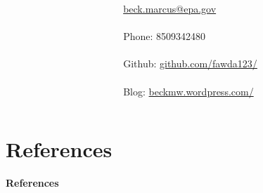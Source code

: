 \documentclass[serif]{beamer}\usepackage[]{graphicx}\usepackage[]{color}
\begin{document}
\begin{frame}
\begin{columns}
\begin{column}{0.5\textwidth}
\end{column}
\begin{column}{0.5\textwidth}
\scriptsize
\href{mailto:beck.marcus@epa.gov}{beck.marcus@epa.gov} \\~\\
Phone: 8509342480 \\~\\
Github: \href{https://github.com/fawda123/}{github.com/fawda123/} \\~\\
Blog: \href{http://beckmw.wordpress.com/}{beckmw.wordpress.com/}
\end{column}
\end{columns}
\vspace{0.2in}
\end{frame}

\section{References}
\begin{frame}[t]{\textbf{References}}
\tiny
{}


\end{frame}
\end{document}

